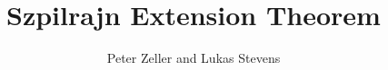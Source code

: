 \documentclass[11pt,a4paper]{article}
\begin{document}
\title{Szpilrajn Extension Theorem}
\author{Peter Zeller and Lukas Stevens}
\maketitle






\end{document}
